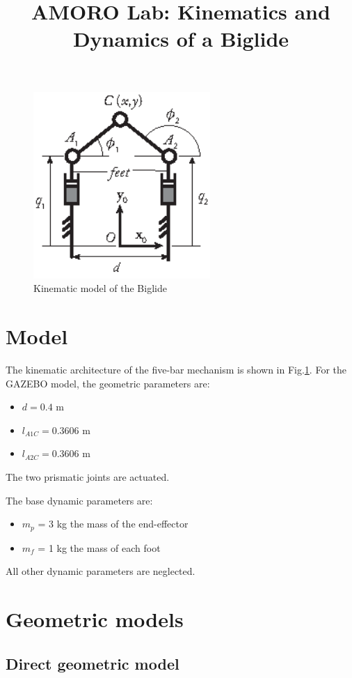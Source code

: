 \documentclass[a4paper]{article}
\title{AMORO Lab: Kinematics and Dynamics of a Biglide}
\author{} %
\date{} %
\begin{document}
\maketitle
\begin{figure}[h!]
\centering
\includegraphics[width=0.6\textwidth]{PuRRRPu.eps}
\caption{Kinematic model of the Biglide}
\label{fig:biglide}
\end{figure}
\section{Model}
%
The kinematic architecture of the five-bar mechanism is shown in Fig.\ref{fig:biglide}. For the GAZEBO model, the geometric parameters are: 
\begin{itemize}
\item    $d=0.4$ m
\item    $l_{A1C}=0.3606$ m
\item    $l_{A2C}=0.3606$ m
\end{itemize}
The two prismatic joints are actuated. 

The base dynamic parameters are: 
\begin{itemize}
\item $m_p$ = 3 kg the mass of the end-effector
\item $m_f$ = 1 kg the mass of each foot
\end{itemize} 
All other dynamic parameters are neglected. 

\section{Geometric models}
%
\subsection{Direct geometric model}
%
\end{document}
